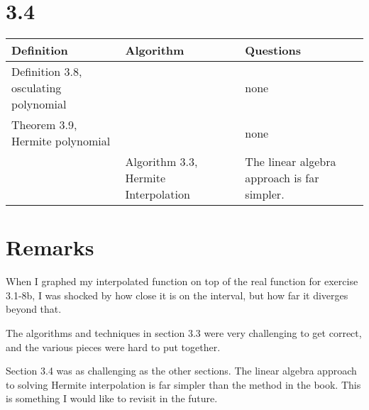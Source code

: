 \documentclass{article}
\begin{document}
\section*{3.4}

\begin{tabularx}{\textwidth}{ |X|X|X| }
    \hline
	{\bf Definition} & {\bf Algorithm} & {\bf Questions} \\
    \hline
	Definition 3.8, osculating polynomial & & none \\
    \hline
	Theorem 3.9, Hermite polynomial & & none \\
    \hline
	 & Algorithm 3.3, Hermite Interpolation & The linear algebra approach is far simpler. \\
    \hline
\end{tabularx}

\section*{Remarks}

When I graphed my interpolated function on top of the real function for exercise 3.1-8b, I was shocked by how close it is on the interval, but how far it diverges beyond that.

The algorithms and techniques in section 3.3 were very challenging to get correct, and the various pieces were hard to put together.

Section 3.4 was as challenging as the other sections.
The linear algebra approach to solving Hermite interpolation is far simpler than the method in the book.
This is something I would like to revisit in the future.
\end{document}
